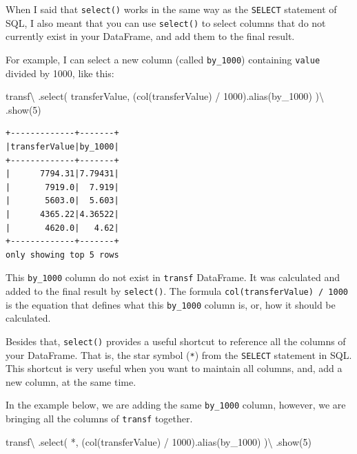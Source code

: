 \documentclass[
  11pt,
  letterpaper,
  DIV=11,
  numbers=noendperiod]{scrreprt}
\newenvironment{Shaded}{\begin{snugshade}}{\end{snugshade}}
\newcommand{\DecValTok}[1]{\textcolor[rgb]{0.68,0.00,0.00}{#1}}
\newcommand{\NormalTok}[1]{\textcolor[rgb]{0.00,0.23,0.31}{#1}}
\newcommand{\OperatorTok}[1]{\textcolor[rgb]{0.37,0.37,0.37}{#1}}
\newcommand{\StringTok}[1]{\textcolor[rgb]{0.13,0.47,0.30}{#1}}
\begin{document}
When I said that \texttt{select()} works in the same way as the
\texttt{SELECT} statement of SQL, I also meant that you can use
\texttt{select()} to select columns that do not currently exist in your
DataFrame, and add them to the final result.

For example, I can select a new column (called \texttt{by\_1000})
containing \texttt{value} divided by 1000, like this:

\begin{Shaded}
\begin{Highlighting}[]
\NormalTok{transf}\OperatorTok{\textbackslash{}}
\NormalTok{  .select(}
    \StringTok{\textquotesingle{}transferValue\textquotesingle{}}\NormalTok{,}
\NormalTok{    (col(}\StringTok{\textquotesingle{}transferValue\textquotesingle{}}\NormalTok{) }\OperatorTok{/} \DecValTok{1000}\NormalTok{).alias(}\StringTok{\textquotesingle{}by\_1000\textquotesingle{}}\NormalTok{)}
\NormalTok{  )}\OperatorTok{\textbackslash{}}
\NormalTok{  .show(}\DecValTok{5}\NormalTok{)}
\end{Highlighting}
\end{Shaded}

\begin{verbatim}
+-------------+-------+
|transferValue|by_1000|
+-------------+-------+
|      7794.31|7.79431|
|       7919.0|  7.919|
|       5603.0|  5.603|
|      4365.22|4.36522|
|       4620.0|   4.62|
+-------------+-------+
only showing top 5 rows
\end{verbatim}

This \texttt{by\_1000} column do not exist in \texttt{transf} DataFrame.
It was calculated and added to the final result by \texttt{select()}.
The formula
\texttt{col(\textquotesingle{}transferValue\textquotesingle{})\ /\ 1000}
is the equation that defines what this \texttt{by\_1000} column is, or,
how it should be calculated.

Besides that, \texttt{select()} provides a useful shortcut to reference
all the columns of your DataFrame. That is, the star symbol (\texttt{*})
from the \texttt{SELECT} statement in SQL. This shortcut is very useful
when you want to maintain all columns, and, add a new column, at the
same time.

In the example below, we are adding the same \texttt{by\_1000} column,
however, we are bringing all the columns of \texttt{transf} together.

\begin{Shaded}
\begin{Highlighting}[]
\NormalTok{transf}\OperatorTok{\textbackslash{}}
\NormalTok{  .select(}
    \StringTok{\textquotesingle{}*\textquotesingle{}}\NormalTok{,}
\NormalTok{    (col(}\StringTok{\textquotesingle{}transferValue\textquotesingle{}}\NormalTok{) }\OperatorTok{/} \DecValTok{1000}\NormalTok{).alias(}\StringTok{\textquotesingle{}by\_1000\textquotesingle{}}\NormalTok{)}
\NormalTok{  )}\OperatorTok{\textbackslash{}}
\NormalTok{  .show(}\DecValTok{5}\NormalTok{)}
\end{Highlighting}
\end{Shaded}
\end{document}
